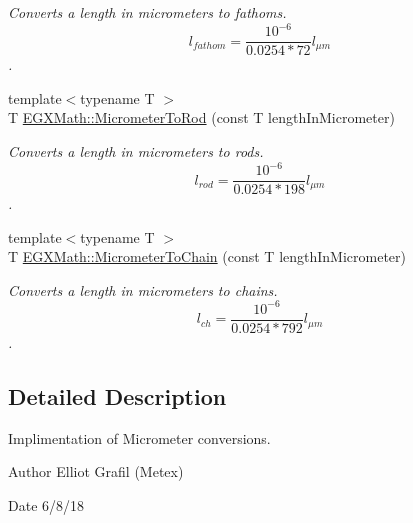 \begin{DoxyCompactItemize}
\begin{DoxyCompactList}\small\item\em Converts a length in micrometers to fathoms. \[ l_{fathom}= \frac{10^{-6}}{0.0254 * 72} l_{\mu m} \]. \end{DoxyCompactList}\item 
{\footnotesize template$<$typename T $>$ }\\T \mbox{\hyperlink{group___e_g_x_math-_conversions-_length_conversions-_s_i-_micrometer-_surveyors_ga86e147ebc58116be9c15a873451ac156}{E\+G\+X\+Math\+::\+Micrometer\+To\+Rod}} (const T length\+In\+Micrometer)
\begin{DoxyCompactList}\small\item\em Converts a length in micrometers to rods. \[ l_{rod}= \frac{10^{-6}}{0.0254 * 198} l_{\mu m} \]. \end{DoxyCompactList}\item 
{\footnotesize template$<$typename T $>$ }\\T \mbox{\hyperlink{group___e_g_x_math-_conversions-_length_conversions-_s_i-_micrometer-_surveyors_ga0462dc1021b3979ea0d83113aedbbc4c}{E\+G\+X\+Math\+::\+Micrometer\+To\+Chain}} (const T length\+In\+Micrometer)
\begin{DoxyCompactList}\small\item\em Converts a length in micrometers to chains. \[ l_{ch}= \frac{10^{-6}}{0.0254 * 792} l_{\mu m} \]. \end{DoxyCompactList}\end{DoxyCompactItemize}


\subsection{Detailed Description}
Implimentation of Micrometer conversions. 

\begin{DoxyAuthor}{Author}
Elliot Grafil (Metex) 
\end{DoxyAuthor}
\begin{DoxyDate}{Date}
6/8/18 
\end{DoxyDate}
